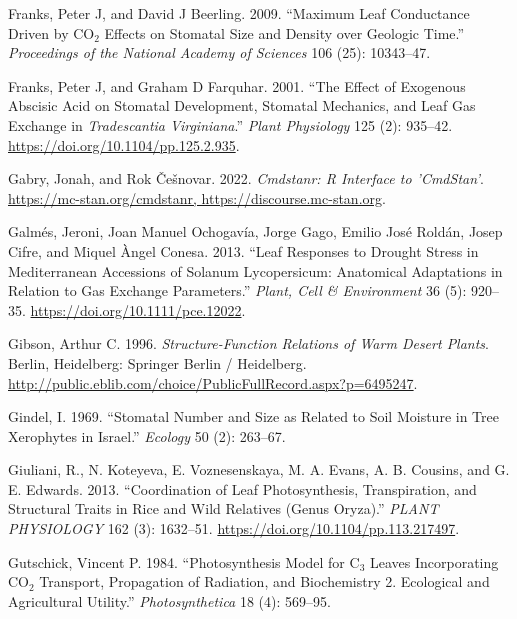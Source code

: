 \documentclass[
  12pt,
]{article}
\newlength{\cslhangindent}
\newlength{\cslentryspacingunit} %
\newenvironment{CSLReferences}[2] %
 {%
  \setlength{\parindent}{0pt}
  \ifodd #1
  \let\oldpar\par
  \def\par{\hangindent=\cslhangindent\oldpar}
  \fi
  \setlength{\parskip}{#2\cslentryspacingunit}
 }%
 {}
\begin{document}
\begin{CSLReferences}{1}{0}
\leavevmode{}%
Franks, Peter J, and David J Beerling. 2009. {``Maximum Leaf Conductance Driven by {CO}\(_{\textrm{2}}\) Effects on Stomatal Size and Density over Geologic Time.''} \emph{Proceedings of the National Academy of Sciences} 106 (25): 10343--47.

\leavevmode{}%
Franks, Peter J, and Graham D Farquhar. 2001. {``The {Effect} of {Exogenous} {Abscisic} {Acid} on {Stomatal} {Development}, {Stomatal} {Mechanics}, and {Leaf} {Gas} {Exchange} in \emph{{Tradescantia} Virginiana}.''} \emph{Plant Physiology} 125 (2): 935--42. \url{https://doi.org/10.1104/pp.125.2.935}.

\leavevmode{}%
Gabry, Jonah, and Rok Češnovar. 2022. \emph{Cmdstanr: {R} {Interface} to '{CmdStan}'}. \href{https://mc-stan.org/cmdstanr,\%20https://discourse.mc-stan.org}{https://mc-stan.org/cmdstanr, https://discourse.mc-stan.org}.

\leavevmode{}%
Galmés, Jeroni, Joan Manuel Ochogavía, Jorge Gago, Emilio José Roldán, Josep Cifre, and Miquel Àngel Conesa. 2013. {``Leaf Responses to Drought Stress in {Mediterranean} Accessions of {Solanum} Lycopersicum: Anatomical Adaptations in Relation to Gas Exchange Parameters.''} \emph{Plant, Cell \& Environment} 36 (5): 920--35. \url{https://doi.org/10.1111/pce.12022}.

\leavevmode{}%
Gibson, Arthur C. 1996. \emph{Structure-{Function} {Relations} of {Warm} {Desert} {Plants}}. Berlin, Heidelberg: Springer Berlin / Heidelberg. \url{http://public.eblib.com/choice/PublicFullRecord.aspx?p=6495247}.

\leavevmode{}%
Gindel, I. 1969. {``Stomatal Number and Size as Related to Soil Moisture in Tree Xerophytes in {Israel}.''} \emph{Ecology} 50 (2): 263--67.

\leavevmode{}%
Giuliani, R., N. Koteyeva, E. Voznesenskaya, M. A. Evans, A. B. Cousins, and G. E. Edwards. 2013. {``Coordination of {Leaf} {Photosynthesis}, {Transpiration}, and {Structural} {Traits} in {Rice} and {Wild} {Relatives} ({Genus} {Oryza}).''} \emph{PLANT PHYSIOLOGY} 162 (3): 1632--51. \url{https://doi.org/10.1104/pp.113.217497}.

\leavevmode{}%
Gutschick, Vincent P. 1984. {``Photosynthesis Model for {C}\(_{\textrm{3}}\) Leaves Incorporating {CO}\(_{\textrm{2}}\) Transport, Propagation of Radiation, and Biochemistry 2. Ecological and Agricultural Utility.''} \emph{Photosynthetica} 18 (4): 569--95.


\end{CSLReferences}
\end{document}

